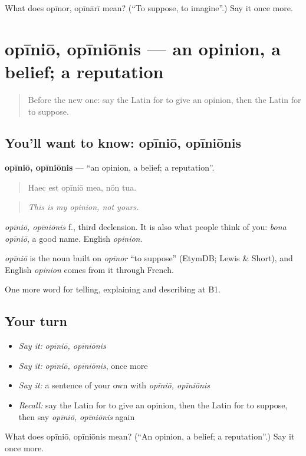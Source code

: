 \begin{tcolorbox}[breakable,colback=teal!4,colframe=teal!35!black,title={Before you move on}]
What does opīnor, opīnārī mean? (\textquotedblleft{}To suppose, to imagine\textquotedblright{}.) Say it once more.
\end{tcolorbox}
\section[opīniō, opīniōnis]{opīniō, opīniōnis — an opinion, a belief; a reputation}

\label{lesson:LA-C357-opinio}



\begin{quote}
Before the new one: say the Latin for to give an opinion, then the Latin for to suppose.
\end{quote}

\subsection*{You'll want to know: opīniō, opīniōnis}
\textbf{opīniō, opīniōnis} — \textquotedblleft{}an opinion, a belief; a reputation\textquotedblright{}.

\begin{quote}
Haec est opīniō mea, nōn tua.
\end{quote}

\begin{quote}
\emph{This is my opinion, not yours.}
\end{quote}

\emph{opīniō, opīniōnis} f., third declension. It is also what people think of you: \emph{bona opīniō}, a good name. English \emph{opinion}.

\begin{cousinweb}
\emph{opīniō} is the noun built on \emph{opīnor} \textquotedblleft{}to suppose\textquotedblright{} (EtymDB; Lewis \& Short), and English \emph{opinion} comes from it through French.
\end{cousinweb}

\begin{grammarlens}[title={What you've built}]
One more word for telling, explaining and describing at B1.
\end{grammarlens}

\subsection*{Your turn}
\begin{itemize}
\raggedright
  \item \emph{Say it:} \emph{opīniō, opīniōnis}
  \item \emph{Say it:} \emph{opīniō, opīniōnis}, once more
  \item \emph{Say it:} a sentence of your own with \emph{opīniō, opīniōnis}
  \item \emph{Recall:} say the Latin for to give an opinion, then the Latin for to suppose, then say \emph{opīniō, opīniōnis} again
\end{itemize}

\begin{tcolorbox}[breakable,colback=teal!4,colframe=teal!35!black,title={Before you move on}]
What does opīniō, opīniōnis mean? (\textquotedblleft{}An opinion, a belief; a reputation\textquotedblright{}.) Say it once more.
\end{tcolorbox}
